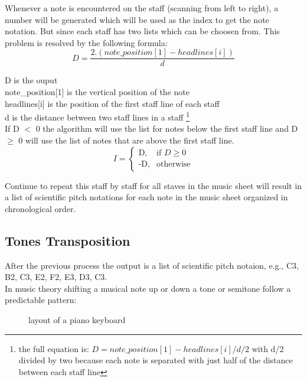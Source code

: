 \documentclass[a4paper,12pt]{report}
\begin{document}
Whenever a note is encountered on the staff (scanning from left to right), a
number will be generated which will be used as the index to get the note
notation. But since each staff has two lists which can be choosen from. This
problem is resolved by the following formula:\\

\[D = \frac{2.(note\_position[1] - headlines[i])}{d}\]

\noindent D is the ouput\\
note\_position[1] is the vertical position of the note\\
headlines[i] is the position of the first staff line of each staff\\
d is the distance between two staff lines in a staff \footnote{the 
full equation is: \(D = note\_position[1] -headlines[i] / d/2\)
with d/2 divided by two because each note is separated with just half of the distance between
each staff line}\\

If D $<$ 0 the algorithm will use the list for notes below the first staff line
and D $\geq$ 0 will use the list of notes that are above the first staff line.\\

\[ I = \begin{cases} \mbox{D,} & \mbox{if } D \geq 0 \\ \mbox{-D,} &
\mbox{otherwise} \end{cases}\]

Continue to repeat this staff by staff for all staves in the music sheet will
result in a list of scientific pitch notations for each note in the music sheet
organized in chronological order.\\

\subsection{Tones Transposition}
After the previous process the output is a list of scientific pitch notaion,
e.g., C3, B2, C3, E2, F2, E3, D3, C3.\\

In music theory shifting a musical note up or down a tone or semitone follow a
predictable pattern:

\begin{figure}[h]
    \caption{layout of a piano keyboard}
    \label{piano_keyboard}
\end{figure}
\end{document}
